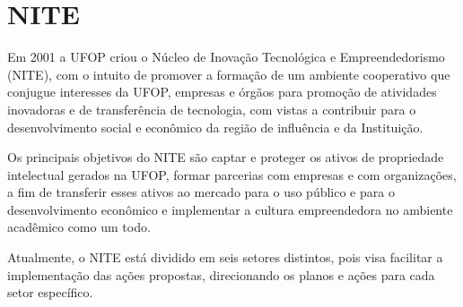 \section{NITE}
Em 2001 a UFOP criou o Núcleo de Inovação Tecnológica e Empreendedorismo (NITE), com o intuito de promover a formação de um ambiente cooperativo que conjugue interesses da UFOP, empresas e órgãos para promoção de atividades inovadoras e de transferência de tecnologia, com vistas a contribuir para o desenvolvimento social e econômico da região de influência e da Instituição.

Os principais objetivos do NITE são captar e proteger os ativos de propriedade intelectual gerados na UFOP, formar parcerias com empresas e com organizações, a fim de transferir esses ativos ao mercado para o uso público e para o desenvolvimento econômico e implementar a cultura empreendedora no ambiente acadêmico como um todo.

Atualmente, o NITE está dividido em seis setores distintos, pois visa facilitar a implementação das ações propostas, direcionando os planos e ações para cada setor específico.